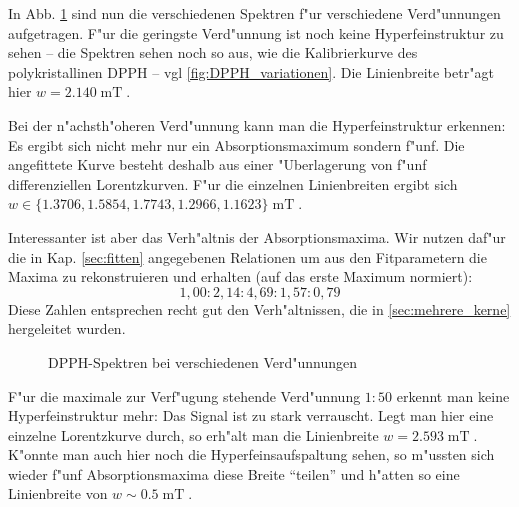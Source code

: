 \documentclass[a4paper,12pt]{article}
\begin{document}
In Abb. \ref{fig:verd_spektren} sind nun die verschiedenen Spektren
f"ur verschiedene Verd"unnungen aufgetragen. F"ur die geringste
Verd"unnung ist noch keine Hyperfeinstruktur zu sehen -- die Spektren
sehen noch so aus, wie die Kalibrierkurve des polykristallinen DPPH --
vgl \ref{fig:DPPH_variationen}. Die Linienbreite betr"agt hier $w =
2.140\operatorname{mT}$.

Bei der n"achsth"oheren Verd"unnung kann man die Hyperfeinstruktur
erkennen: Es ergibt sich nicht mehr nur ein Absorptionsmaximum sondern
f"unf. Die angefittete Kurve besteht deshalb aus einer "Uberlagerung
von f"unf differenziellen Lorentzkurven. F"ur die einzelnen
Linienbreiten ergibt sich $w \in \{1.3706 ,  1.5854 ,1.7743 , 1.2966 ,
  1.1623\} \operatorname{mT}$.

 
  Interessanter ist aber das Verh"altnis der Absorptionsmaxima. Wir
  nutzen daf"ur die in Kap. \ref{sec:fitten} angegebenen Relationen um
  aus den Fitparametern die Maxima zu rekonstruieren und erhalten (auf
  das erste Maximum normiert):
\begin{equation*}
1,00 : 2,14 : 4,69 : 1,57 : 0,79
\end{equation*}
Diese Zahlen entsprechen recht gut den Verh"altnissen, die in
\ref{sec:mehrere_kerne} hergeleitet wurden.




\addtolength{\topmargin}{-2cm}

\begin{figure}[!h]
  \centering {}
  \caption{DPPH-Spektren bei verschiedenen Verd"unnungen}
  \label{fig:verd_spektren}
\end{figure}

\addtolength{\topmargin}{2cm}


F"ur die maximale zur Verf"ugung stehende Verd"unnung $1:50$ erkennt
man keine Hyperfeinstruktur mehr: Das Signal ist zu stark
verrauscht. Legt man hier eine einzelne Lorentzkurve durch, so erh"alt
man die Linienbreite $w = 2.593\operatorname{mT}$.  K"onnte man auch
hier noch die Hyperfeinsaufspaltung sehen, so m"ussten sich wieder
f"unf Absorptionsmaxima diese Breite "`teilen"' und h"atten so eine
Linienbreite von $w \sim 0.5\operatorname{mT}$.
\end{document}
